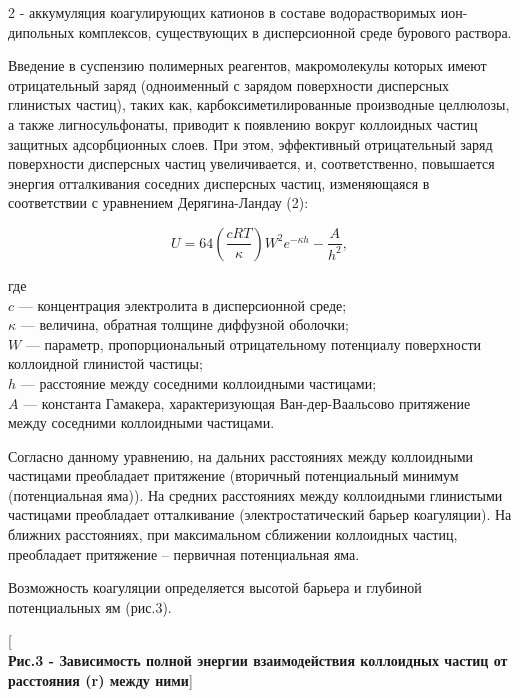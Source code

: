 \begin{multicols}{2}
- аккумуляция коагулирующих катионов в составе водорастворимых
ион-дипольных комплексов, существующих в дисперсионной среде бурового
раствора.

Введение в суспензию полимерных реагентов, макромолекулы которых имеют
отрицательный заряд (одноименный с зарядом поверхности дисперсных
глинистых частиц), таких как, карбоксиметилированные производные
целлюлозы, а также лигносульфонаты, приводит к появлению вокруг
коллоидных частиц защитных адсорбционных слоев. При этом, эффективный
отрицательный заряд поверхности дисперсных частиц увеличивается, и,
соответственно, повышается энергия отталкивания соседних дисперсных
частиц, изменяющаяся в соответствии с уравнением Дерягина-Ландау (2):

\begin{equation}
U = 64 \left( \frac{c R T}{\kappa} \right) W^{2} e^{-\kappa h} - \frac{A}{h^{2}},
\end{equation}

где \\
$c$ --- концентрация электролита в дисперсионной среде; \\
$\kappa$ --- величина, обратная толщине диффузной оболочки; \\
$W$ --- параметр, пропорциональный отрицательному потенциалу поверхности коллоидной глинистой частицы; \\
$h$ --- расстояние между соседними коллоидными частицами; \\
$A$ --- константа Гамакера, характеризующая Ван-дер-Ваальсово притяжение между соседними коллоидными частицами.

Согласно данному уравнению, на дальних расстояниях между коллоидными
частицами преобладает притяжение (вторичный потенциальный минимум
(потенциальная яма)). На средних расстояниях между коллоидными
глинистыми частицами преобладает отталкивание (электростатический барьер
коагуляции). На ближних расстояниях, при максимальном сближении
коллоидных частиц, преобладает притяжение -- первичная потенциальная
яма.

Возможность коагуляции определяется высотой барьера и глубиной
потенциальных ям (рис.3).
\end{multicols}

[\\{\bfseries Рис.3 - Зависимость полной энергии
взаимодействия коллоидных частиц от расстояния (r) между ними}]

